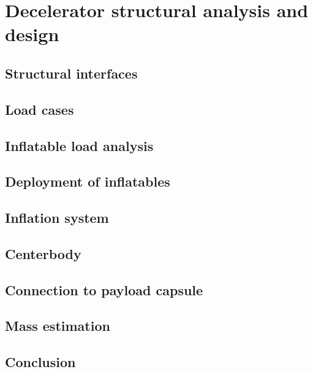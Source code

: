 \section{Decelerator structural analysis and design}\label{cha:structures}

\subsection{Structural interfaces}


\subsection{Load cases}


\subsection{Inflatable load analysis}


\subsection{Deployment of inflatables}


\subsection{Inflation system}


\subsection{Centerbody}


\subsection{Connection to payload capsule}


\subsection{Mass estimation}


\subsection{Conclusion}
